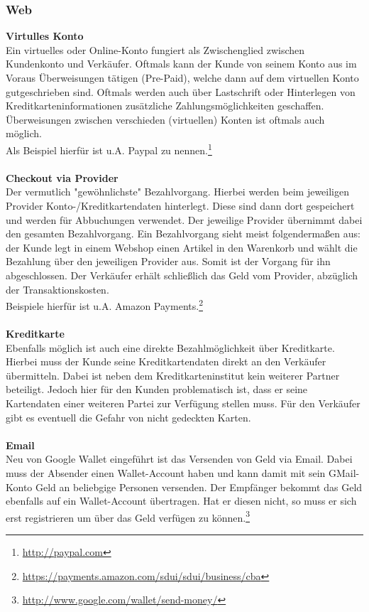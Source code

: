 \subsubsection{Web}
\textbf{Virtulles Konto}\\
Ein virtuelles oder Online-Konto fungiert als Zwischenglied zwischen Kundenkonto und Verkäufer. Oftmals kann der Kunde von seinem Konto aus im Voraus Überweisungen tätigen (Pre-Paid), welche dann auf dem virtuellen Konto gutgeschrieben sind. Oftmals werden auch über Lastschrift oder Hinterlegen von Kreditkarteninformationen zusätzliche Zahlungsmöglichkeiten geschaffen.\\
Überweisungen zwischen verschieden (virtuellen) Konten ist oftmals auch möglich.\\
Als Beispiel hierfür ist u.A. Paypal zu nennen.\footnote{\url{http://paypal.com}}\\
\\
\textbf{Checkout via Provider}\\
Der vermutlich "gewöhnlichste" Bezahlvorgang. Hierbei werden beim jeweiligen Provider Konto-/Kreditkartendaten hinterlegt. Diese sind dann dort gespeichert und werden für Abbuchungen verwendet.
Der jeweilige Provider übernimmt dabei den gesamten Bezahlvorgang. Ein Bezahlvorgang sieht meist folgendermaßen aus: der Kunde legt in einem Webshop einen Artikel in den Warenkorb und wählt die Bezahlung über den jeweiligen Provider aus. Somit ist der Vorgang für ihn abgeschlossen. Der Verkäufer erhält schließlich das Geld vom Provider, abzüglich der Transaktionskosten.\\
Beispiele hierfür ist u.A. Amazon Payments.\footnote{\url{https://payments.amazon.com/sdui/sdui/business/cba}}\\
\\
\textbf{Kreditkarte}\\
Ebenfalls möglich ist auch eine direkte Bezahlmöglichkeit über Kreditkarte. Hierbei muss der Kunde seine Kreditkartendaten direkt an den Verkäufer übermitteln. Dabei ist neben dem Kreditkarteninstitut kein weiterer Partner beteiligt. Jedoch hier für den Kunden problematisch ist, dass er seine Kartendaten einer weiteren Partei zur Verfügung stellen muss. Für den Verkäufer gibt es eventuell die Gefahr von nicht gedeckten Karten.\\
\\
\textbf{Email}\\
Neu von Google Wallet eingeführt ist das Versenden von Geld via Email. Dabei muss der Absender einen Wallet-Account haben und kann damit mit sein GMail-Konto Geld an beliebgige Personen versenden. Der Empfänger bekommt das Geld ebenfalls auf ein Wallet-Account übertragen. Hat er diesen nicht, so muss er sich erst registrieren um über das Geld verfügen zu können.\footnote{\url{http://www.google.com/wallet/send-money/}}\\

